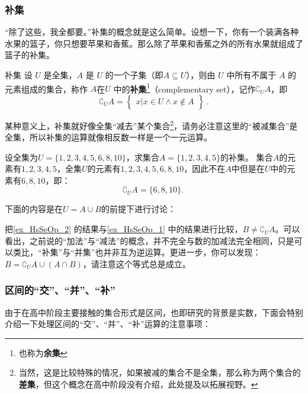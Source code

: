 \subsubsection{补集}

“除了这些，我全都要。”补集的概念就是这么简单。设想一下，你有一个装满各种水果的篮子，你只想要苹果和香蕉。那么除了苹果和香蕉之外的所有水果就组成了篮子的补集。

\begin{definition}{补集}\label{def_HsSeOp_1}
设 $U$ 是全集，$A$ 是 $U$ 的一个子集（即$A\subseteq U$），则由 $U$ 中所有不属于 $A$ 的元素组成的集合，称作 $A$在$U$ 中的\textbf{补集}\footnote{也称为\textbf{余集}}（complementary set），记作$\complement_UA$，即
\begin{equation}
\complement_UA = \begin{Bmatrix}x|x\in U \wedge x\notin A\end{Bmatrix}~.
\end{equation}
\end{definition}


某种意义上，补集就好像全集“减去”某个集合\footnote{当然，这是比较特殊的情况，如果被减的集合不是全集，那么称为两个集合的\textbf{差集}，但这个概念在高中阶段没有介绍，此处提及以拓展视野。}，请务必注意这里的“被减集合”是全集，所以补集的运算就像相反数一样是一个一元运算。

\begin{example}{设全集为$U=\{1,2,3,4,5,6,8,10\}$，求集合$A=\{1,2,3,4,5\}$的补集。}\label{ex_HsSeOp_2}
集合$A$的元素有$1,2,3,4,5$，全集$U$的元素有$1,2,3,4,5,6,8,10$，因此不在$A$中但是在$U$中的元素有$6,8,10$，即：
$$
\complement_UA=\{6,8,10\}.~
$$
\end{example}

下面的内容是在$U=A\cup B$的前提下进行讨论：

把\autoref{ex_HsSeOp_2} 的结果与\autoref{ex_HsSeOp_1} 中的结果进行比较，$B\neq\complement_UA$。可以看出，之前说的“加法”与“减法”的概念，并不完全与数的加减法完全相同，只是可以类比，“补集”与“并集”也并非互为逆运算。更进一步，你可以发现：$\displaystyle B=\complement_{U}A\cup(A\cap B)$，请注意这个等式总是成立。

\subsubsection{区间的“交”、“并”、“补”}

由于在高中阶段主要接触的集合形式是区间，也即研究的背景是实数，下面会特别介绍一下处理区间的“交”、“并”、“补”运算的注意事项：

